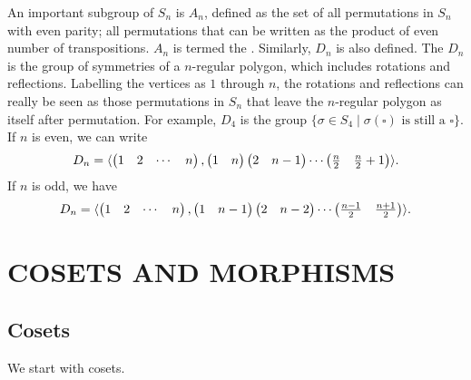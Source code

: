 An important subgroup of $S_{n}$ is $A_{n}$, defined as the set of all permutations in $S_{n}$ with even parity; all permutations that can be written as the product of even number of transpositions. $A_{n}$ is termed the . Similarly, $D_{n}$ is also defined. The  $D_{n}$ is the group of symmetries of a $n$-regular polygon, which includes rotations and reflections. Labelling the vertices as $1$ through $n$, the rotations and reflections can really be seen as those permutations in $S_{n}$ that leave the $n$-regular polygon as itself after permutation. For example, $D_{4}$ is the group $\{\sigma \in S_{4} \mid \sigma(\square) \text{ is still a } \square\}$. If $n$ is even, we can write
\begin{align}
    D_{n} = \langle\begin{pmatrix}
        1 & 2 & \cdots & n
    \end{pmatrix}, \begin{pmatrix}
        1 & n
    \end{pmatrix} \begin{pmatrix}
        2 & n-1
    \end{pmatrix} \cdots \begin{pmatrix}
        \frac{n}{2} & \frac{n}{2}+1
    \end{pmatrix}\rangle.
\end{align}
If $n$ is odd, we have
\begin{align}
    D_{n} = \langle\begin{pmatrix}
        1 & 2 & \cdots & n
    \end{pmatrix}, \begin{pmatrix}
        1 & n-1
    \end{pmatrix} \begin{pmatrix}
        2 & n-2
    \end{pmatrix} \cdots \begin{pmatrix}
        \frac{n-1}{2} & \frac{n+1}{2}
    \end{pmatrix}\rangle.
\end{align}

\chapter{COSETS AND MORPHISMS}

\section{Cosets}
We start with cosets.

